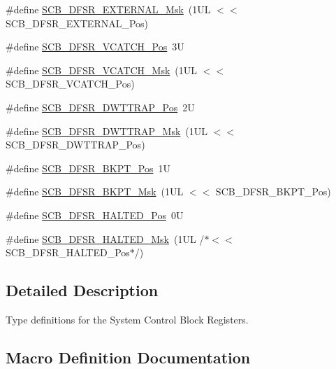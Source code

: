 \begin{DoxyCompactItemize}
\#define \hyperlink{group___c_m_s_i_s___s_c_b_ga3cba2ec1f588ce0b10b191d6b0d23399}{S\+C\+B\+\_\+\+D\+F\+S\+R\+\_\+\+E\+X\+T\+E\+R\+N\+A\+L\+\_\+\+Msk}~(1\+U\+L $<$$<$ S\+C\+B\+\_\+\+D\+F\+S\+R\+\_\+\+E\+X\+T\+E\+R\+N\+A\+L\+\_\+\+Pos)
\item 
\#define \hyperlink{group___c_m_s_i_s___s_c_b_gad02d3eaf062ac184c18a7889c9b6de57}{S\+C\+B\+\_\+\+D\+F\+S\+R\+\_\+\+V\+C\+A\+T\+C\+H\+\_\+\+Pos}~3U
\item 
\#define \hyperlink{group___c_m_s_i_s___s_c_b_gacbb931575c07b324ec793775b7c44d05}{S\+C\+B\+\_\+\+D\+F\+S\+R\+\_\+\+V\+C\+A\+T\+C\+H\+\_\+\+Msk}~(1\+U\+L $<$$<$ S\+C\+B\+\_\+\+D\+F\+S\+R\+\_\+\+V\+C\+A\+T\+C\+H\+\_\+\+Pos)
\item 
\#define \hyperlink{group___c_m_s_i_s___s_c_b_gaccf82364c6d0ed7206f1084277b7cc61}{S\+C\+B\+\_\+\+D\+F\+S\+R\+\_\+\+D\+W\+T\+T\+R\+A\+P\+\_\+\+Pos}~2U
\item 
\#define \hyperlink{group___c_m_s_i_s___s_c_b_ga3f7384b8a761704655fd45396a305663}{S\+C\+B\+\_\+\+D\+F\+S\+R\+\_\+\+D\+W\+T\+T\+R\+A\+P\+\_\+\+Msk}~(1\+U\+L $<$$<$ S\+C\+B\+\_\+\+D\+F\+S\+R\+\_\+\+D\+W\+T\+T\+R\+A\+P\+\_\+\+Pos)
\item 
\#define \hyperlink{group___c_m_s_i_s___s_c_b_gaf28fdce48655f0dcefb383aebf26b050}{S\+C\+B\+\_\+\+D\+F\+S\+R\+\_\+\+B\+K\+P\+T\+\_\+\+Pos}~1U
\item 
\#define \hyperlink{group___c_m_s_i_s___s_c_b_ga609edf8f50bc49adb51ae28bcecefe1f}{S\+C\+B\+\_\+\+D\+F\+S\+R\+\_\+\+B\+K\+P\+T\+\_\+\+Msk}~(1\+U\+L $<$$<$ S\+C\+B\+\_\+\+D\+F\+S\+R\+\_\+\+B\+K\+P\+T\+\_\+\+Pos)
\item 
\#define \hyperlink{group___c_m_s_i_s___s_c_b_gaef4ec28427f9f88ac70a13ae4e541378}{S\+C\+B\+\_\+\+D\+F\+S\+R\+\_\+\+H\+A\+L\+T\+E\+D\+\_\+\+Pos}~0U
\item 
\#define \hyperlink{group___c_m_s_i_s___s_c_b_ga200bcf918d57443b5e29e8ce552e4bdf}{S\+C\+B\+\_\+\+D\+F\+S\+R\+\_\+\+H\+A\+L\+T\+E\+D\+\_\+\+Msk}~(1\+U\+L /$\ast$$<$$<$ S\+C\+B\+\_\+\+D\+F\+S\+R\+\_\+\+H\+A\+L\+T\+E\+D\+\_\+\+Pos$\ast$/)
\end{DoxyCompactItemize}


\subsection{Detailed Description}
Type definitions for the System Control Block Registers. 



\subsection{Macro Definition Documentation}
